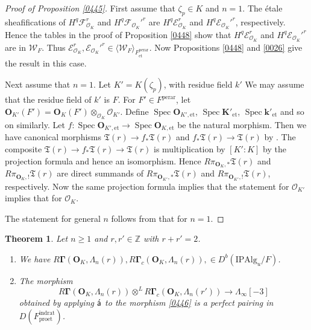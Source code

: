 \documentclass{amsart}
\newtheorem{Thm}{Theorem}[subsection]
\theoremstyle{remark}
\numberwithin{equation}{subsection}
\newcommand{\Order}{\mathcal{O}}
\newcommand{\tensor}{\mathbin{\otimes}}
\newcommand{\Z}{\mathbb{Z}}
\newcommand{\et}{\mathrm{et}}
\newcommand{\rat}{\mathrm{rat}}
\newcommand{\ind}{\mathrm{ind}}
\newcommand{\pro}{\mathrm{pro}}
\newcommand{\perar}{\mathrm{perar}}
\newcommand{\Alg}{\mathrm{Alg}}
\newcommand{\Ind}{\mathrm{I}}
\newcommand{\Pro}{\mathrm{P}}
\newcommand{\alg}[1]{\mathbf{#1}}
\newcommand{\algebrize}{\Acute{\mathsf{a}}}
\newcommand{\genby}[1]{\langle #1 \rangle}
\DeclareMathOperator{\Spec}{Spec}
\begin{document}
\begin{proof}[Proof of Proposition \ref{0445}]
	First assume that $\zeta_{p} \in K$ and $n = 1$.
	The \'etale sheafifications of
	$H^{q} \mathcal{F}_{\Order_{K}}^{r}$
	and $H^{q} \mathcal{F}_{\Order_{K}}'^{r}$ are
	$H^{q} \mathcal{E}_{\Order_{K}}^{r}$
	and $H^{q} \mathcal{E}_{\Order_{K}}'^{r}$, respectively.
	Hence the tables in the proof of Proposition \ref{0448} show that
	$H^{q} \mathcal{E}_{\Order_{K}}^{r}$
	and $H^{q} \mathcal{E}_{\Order_{K}}'^{r}$ are in $\mathcal{W}_{F}$.
	Thus
		$
				\mathcal{E}_{\Order_{K}}^{r},
				\mathcal{E}_{\Order_{K}}'^{r}
			\in
				\genby{\mathcal{W}_{F}}_{F^{\perar}_{\et}}
		$.
	Now Propositions \ref{0448} and \ref{0026} give the result in this case.
	
	Next assume that $n = 1$.
	Let $K' = K(\zeta_{p})$, with residue field $k'$
	We may assume that the residue field of $k'$ is $F$.
	For $F' \in F^{\perar}$, let $\alg{O}_{K'}(F') = \alg{O}_{K}(F') \tensor_{\Order_{K}} \Order_{K'}$.
	Define $\Spec \alg{O}_{K', \et}$, $\Spec \alg{K}'_{\et}$, $\Spec \alg{k}'_{\et}$ and so on similarly.
	Let $f \colon \Spec \alg{O}_{K', \et} \to \Spec \alg{O}_{K, \et}$ be the natural morphism.
	Then we have canonical morphisms $\mathfrak{T}(r) \to f_{\ast} \mathfrak{T}(r)$
	and $f_{\ast}\mathfrak{T}(r) \to \mathfrak{T}(r)$
	by \cite[Theorem 1.1.2]{Sat07}.
	The composite $\mathfrak{T}(r) \to f_{\ast} \mathfrak{T}(r) \to \mathfrak{T}(r)$
	is multiplication by $[K' : K]$ by the projection formula \cite[Corollary 7.2.4]{Sat07}
	and hence an isomorphism.
	Hence $R \pi_{\alg{O}_{K}, \ast} \mathfrak{T}(r)$ and $R \pi_{\alg{O}_{K}, !} \mathfrak{T}(r)$
	are direct summands of
	$R \pi_{\alg{O}_{K'}, \ast} \mathfrak{T}(r)$ and $R \pi_{\alg{O}_{K'}, !} \mathfrak{T}(r)$,
	respectively.
	Now the same projection formula implies that the statement for $\Order_{K'}$
	implies that for $\Order_{K}$.
	
	The statement for general $n$ follows from that for $n = 1$.
\end{proof}

\begin{Thm}
	Let $n \ge 1$ and $r, r' \in \Z$ with $r + r' = 2$.
	\begin{enumerate}
		\item
			We have
				$
						R \alg{\Gamma}(\alg{O}_{K}, \Lambda_{n}(r)),
						R \alg{\Gamma}_{c}(\alg{O}_{K}, \Lambda_{n}(r)),
					\in
						D^{b}(\Ind \Pro \Alg_{u} / F)
				$.
		\item
			The morphism
				\[
							R \alg{\Gamma}(\alg{O}_{K}, \Lambda_{n}(r))
						\tensor^{L}
							R \alg{\Gamma}_{c}(\alg{O}_{K}, \Lambda_{n}(r'))
					\to
						\Lambda_{\infty}[-3]
				\]
			obtained by applying $\algebrize$ to the morphism \eqref{0446}
			is a perfect pairing in $D(F^{\ind\rat}_{\pro\et})$.
	\end{enumerate}
\end{Thm}
\end{document}
